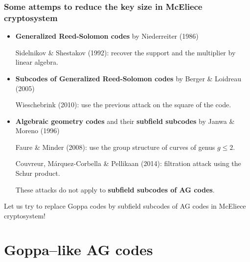 \documentclass[
10pt, %
%
aspectratio=169, %
]{beamer}
\begin{document}
\begin{frame}
	\frametitle{Some attemps to reduce the key size in McEliece cryptosystem}
	
	\begin{itemize}
		\item \textbf{Generalized Reed-Solomon codes} by Niederreiter (1986)
		
		\textcolor{bred}{\faHammer} Sidelnikov \& Shestakov (1992): recover the support and the multiplier by linear algebra. 
		
		\item \textbf{Subcodes of Generalized Reed-Solomon codes} by Berger \& Loidreau (2005)
		
		\textcolor{bred}{\faHammer} Wieschebrink (2010): use the previous attack on the \alert{square} of the code.
			
		\item \textbf{Algebraic geometry codes} and their \textbf{subfield subcodes} by Janwa \& Moreno (1996)
		
		
		\textcolor{bred}{\faHammer} Faure \& Minder (2008): use the group structure  of curves of genus $g \leq 2$.
		
		\textcolor{bred}{\faHammer} Couvreur, Márquez-Corbella \& Pellikaan (2014): filtration attack using the \alert{Schur product}.
		
		\textcolor{bgreen}{These attacks do not apply to \textbf{subfield subcodes of AG codes}.}
	\end{itemize}
	
	\bigskip
	\pause
	
	\begin{center}\large
		Let us try to replace Goppa codes by subfield subcodes of AG codes in McEliece cryptosystem!
	\end{center}
\end{frame}%

\section{Goppa--like AG codes}
\end{document}
